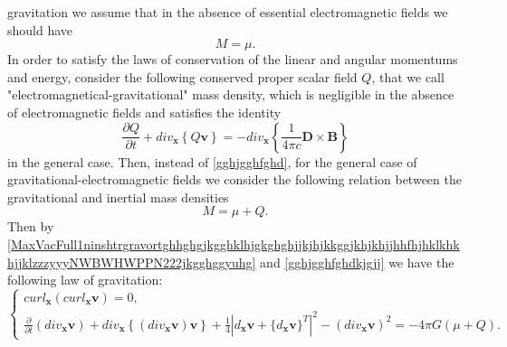 \documentclass{article}
\theoremstyle{definition}
\theoremstyle{remark}
\renewcommand{\vec}[1]{\mathbf{#1}}
\newcommand{\er}{\eqref}
\newcommand{\er}{\eqref}
\begin{document}
gravitation we assume that in the absence of essential
electromagnetic fields we should have
\begin{equation}\label{gghjgghfghd}
M=\mu.
\end{equation}
In order to satisfy the laws of conservation of the linear and
angular momentums and energy, consider the following conserved
proper scalar field $Q$, that we call
"electromagnetical-gravitational" mass density, which is negligible
in the absence of electromagnetic fields and satisfies the identity
\begin{equation}
\label{MaxVacFull1ninshtrgravortghhghgjkgghklhjgkghghjjkjhjkkggjkhjkhjjhhfhjhklkhkhjjklzzzyyyNWNWBWHWPPN}
\frac{\partial Q}{\partial t}+div_{\vec x}\left\{Q\vec v\right\}=-
div_\vec x\left\{\frac{1}{4\pi c}\vec D\times \vec B\right\}
\end{equation}
in the general case. Then, instead of \er{gghjgghfghd}, for the
general case of gravitational-electromagnetic fields we consider the
following relation between the gravitational and inertial mass
densities
\begin{equation}\label{gghjgghfghdkjgjj}
M=\mu+Q.
\end{equation}
Then by
\er{MaxVacFull1ninshtrgravortghhghgjkgghklhjgkghghjjkjhjkkggjkhjkhjjhhfhjhklkhkhjjklzzzyyyNWBWHWPPN222jkgghggyuhg}
and \er{gghjgghfghdkjgjj} we have the following law of gravitation:
\begin{equation}
\label{MaxVacFull1ninshtrgravortghhghgjkgghklhjgkghghjjkjhjkkggjkhjkhjjhhfhjhklkhkhjjklzzzyyyNWBWHWPPN}
\begin{cases}
curl_{\vec x}\left(curl_{\vec x}\vec v\right)= 0,\\
\frac{\partial}{\partial t}\left(div_{\vec x}\vec v\right)+div_{\vec
x}\left\{\left(div_{\vec x}\vec v\right)\vec
v\right\}+\frac{1}{4}\left|d_{\vec x}\vec v+\{d_{\vec x}\vec
v\}^T\right|^2-\left(div_{\vec x}\vec v\right)^2=  -4\pi G(\mu+Q).
\end{cases}
\end{equation}
%
%
%
\begin{comment}
\begin{equation}
\label{MaxVacFull1ninshtrgravortghhghgjkgghklhjgkghghjjkjhjkkggjkhjkhjjhhfhjhklkhkhjjklzzzyyyNWBWHWPPN222jkgghggyuhgghjhg}
\begin{cases}
curl_{\vec x}\left(curl_{\vec x}\vec v\right)= 0,\\
\frac{\partial}{\partial t}\left(div_{\vec x}\vec v\right)+\vec
v\cdot\nabla_{\vec x}\left(div_{\vec x}\vec
v\right)+\frac{1}{4}\left|d_{\vec x}\vec v+\{d_{\vec x}\vec
v\}^T\right|^2= -4\pi G(\mu+Q).
\end{cases}
\end{equation}
\end{comment}
\end{document}
